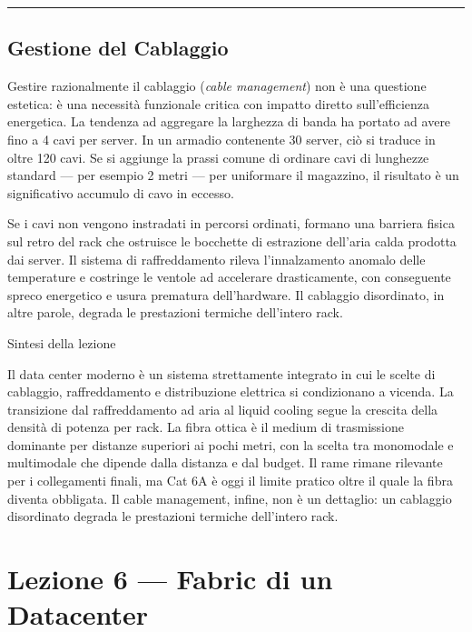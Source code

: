 \documentclass[
  italian,
  openany]{book}
\begin{document}
\begin{center}\rule{0.5\linewidth}{0.5pt}\end{center}

\section{Gestione del Cablaggio}\label{gestione-del-cablaggio}

Gestire razionalmente il cablaggio (\emph{cable management}) non è una
questione estetica: è una necessità funzionale critica con impatto
diretto sull'efficienza energetica. La tendenza ad aggregare la
larghezza di banda ha portato ad avere fino a 4 cavi per server. In un
armadio contenente 30 server, ciò si traduce in oltre 120 cavi. Se si
aggiunge la prassi comune di ordinare cavi di lunghezze standard --- per
esempio 2 metri --- per uniformare il magazzino, il risultato è un
significativo accumulo di cavo in eccesso.

Se i cavi non vengono instradati in percorsi ordinati, formano una
barriera fisica sul retro del rack che ostruisce le bocchette di
estrazione dell'aria calda prodotta dai server. Il sistema di
raffreddamento rileva l'innalzamento anomalo delle temperature e
costringe le ventole ad accelerare drasticamente, con conseguente spreco
energetico e usura prematura dell'hardware. Il cablaggio disordinato, in
altre parole, degrada le prestazioni termiche dell'intero rack.

\begin{calloutnote}{Sintesi della lezione}

Il data center moderno è un sistema strettamente integrato in cui le
scelte di cablaggio, raffreddamento e distribuzione elettrica si
condizionano a vicenda. La transizione dal raffreddamento ad aria al
liquid cooling segue la crescita della densità di potenza per rack. La
fibra ottica è il medium di trasmissione dominante per distanze
superiori ai pochi metri, con la scelta tra monomodale e multimodale che
dipende dalla distanza e dal budget. Il rame rimane rilevante per i
collegamenti finali, ma Cat 6A è oggi il limite pratico oltre il quale
la fibra diventa obbligata. Il cable management, infine, non è un
dettaglio: un cablaggio disordinato degrada le prestazioni termiche
dell'intero rack.

\end{calloutnote}

\newpage

\chapter{Lezione 6 --- Fabric di un
Datacenter}\label{lezione-6-fabric-di-un-datacenter}
\end{document}
